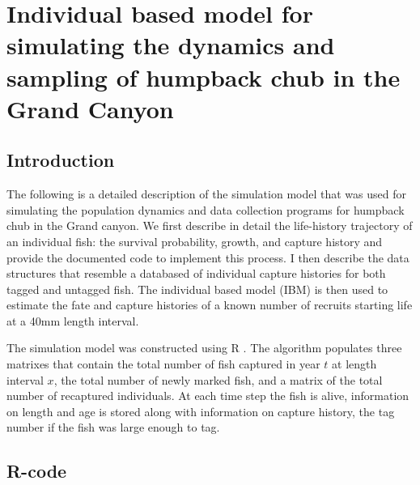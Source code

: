 \section{Individual based model for simulating the dynamics and sampling of humpback chub in the Grand Canyon}

\subsection{Introduction}
The following is a detailed description of the simulation model that was used for simulating the population dynamics and data collection programs for humpback chub in the Grand canyon. We first describe in detail the life-history trajectory of an individual fish: the survival probability, growth, and capture history and provide the documented code to implement this process. I then describe the data structures that resemble a databased of individual capture histories for both tagged and untagged fish.   The individual based model (IBM) is then used to estimate the fate and capture histories of a known number of recruits starting life at a 40mm length interval.

The simulation model was constructed using R \citep{R-Development-Core-Team:2009fk}.  The algorithm populates three matrixes that contain the total number of fish captured in year $t$ at length interval $x$, the total number of newly marked fish, and a matrix of the total number of recaptured individuals.  At each time step the fish is alive, information on length and age is stored along with information on capture history, the tag number if the fish was large enough to tag.
\footnotesize
\subsection{R-code}
